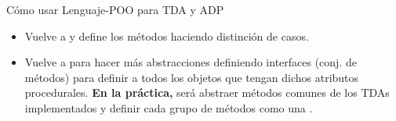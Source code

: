 \documentclass[10pt,envcountsect,spanish]{beamer}
\begin{document}
\begin{frame}{Cómo usar Lenguaje-POO para TDA y ADP}
\begin{itemize}
\item Vuelve a   y define los métodos haciendo distinción de casos.
\end{itemize}

\begin{itemize}
\item  Vuelve a   para hacer más abstracciones definiendo interfaces (conj. de métodos) para definir a todos los objetos que tengan dichos atributos procedurales. 
\textbf{En la práctica,} será abstraer métodos comunes de los TDAs implementados y
definir cada grupo de métodos como una .
\end{itemize}
\end{frame}
\end{document}
